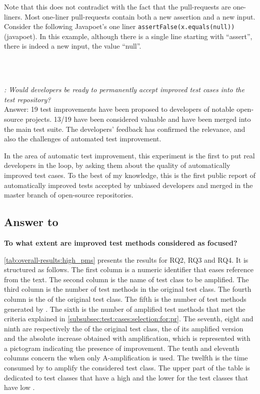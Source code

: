 Note that this does not contradict with the fact that the pull-requests are one-liners.
Most one-liner pull-requests contain both a new assertion and a new input. Consider the following Javapoet's one liner \texttt{assertFalse(x.equals(null))} (javapoet). 
In this example, although there is a single line starting with ``assert'', there is indeed a new input, the value ``null''.

~\\
~\\
\begin{mdframed}
	\textit{\rqpullrequest: Would developers be ready to permanently accept improved test cases into the test repository?}\\
	Answer: 19 test improvements have been proposed to developers of notable open-source projects. 
	13/19 have been considered valuable and have been merged into the main test suite. 
	The developers' feedback has confirmed the relevance, and also the challenges of automated test improvement.
\end{mdframed}

In the area of automatic test improvement, this experiment is the first to put real developers in the loop, by asking them about the quality of automatically improved test cases.
To the best of my knowledge, this is the first public report of automatically improved tests accepted by unbiased developers and merged in the master branch of open-source repositories.




\subsection{Answer to \rqcandidates{}}

\textbf{\rqcandidates{} To what extent are improved test methods considered as focused?}

\autoref{tab:overall-results:high_pms}
presents the results for RQ2, RQ3 and RQ4.%
It is structured as follows.
The first column is a numeric identifier that eases reference from the text.
The second column is the name of test class to be amplified.
The third column is the number of test methods in the original test class.
The fourth column is the \ms of the original test class.
The fifth is the number of test methods generated by \dspot.
The sixth is the number of amplified test methods that met the criteria explained in \autoref{subsubsec:test:cases:selection:for:pr}.
The seventh, eight and ninth are respectively the \ams of the original test class, the \ams of its amplified version and the absolute increase obtained with amplification, which is represented with a pictogram indicating the presence of improvement. 
The tenth and eleventh columns concern the \ams when only A-amplification is used.
The twelfth is the time consumed by \dspot to amplify the considered test class. 
The upper part of the table is dedicated to test classes that have a high \ms and the lower for the test classes that have low \ms.

